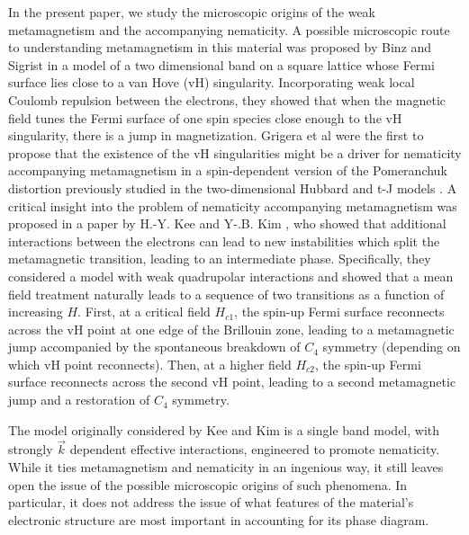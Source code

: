 \documentclass[prb,aps,amssymb,showpacs,twocolumn,amsmath,floatfix]{revtex4}
\begin{document}
In the present paper, we study the microscopic origins of the weak metamagnetism and the accompanying nematicity.  
A possible microscopic route to understanding metamagnetism in this material was proposed by Binz and
Sigrist \cite{Binz2004} in a model  of a 
two dimensional band on a square lattice whose Fermi surface lies close to a van Hove (vH)
singularity.  
Incorporating weak local Coulomb repulsion between the electrons, they showed
that when the magnetic field tunes the Fermi surface of one spin species
close enough to the vH singularity, there is a jump in magnetization. 
Grigera et al \cite{Grigera2004}  were the first to propose that the existence of the vH singularities might be a driver for nematicity accompanying metamagnetism in a spin-dependent version of the Pomeranchuk distortion\cite{Wu2007} previously studied in the two-dimensional Hubbard and t-J models 
\cite{Yamase2000, Halboth2000}.  
A critical insight into the problem of nematicity accompanying metamagnetism was proposed in a paper by H.-Y. Kee and Y-.B. Kim \cite{Kee2005}, who 
 showed that additional interactions between the electrons can
lead to new instabilities which split the metamagnetic transition, leading
to an intermediate phase. Specifically, they considered a model with weak quadrupolar
interactions and showed that a mean field treatment
naturally leads to a sequence of two transitions as a function of increasing $H$. First, at a critical field $H_{c1}$, the spin-up Fermi surface reconnects  across the vH point at one edge of the Brillouin zone, leading to a metamagnetic jump  accompanied by the
spontaneous breakdown of $C_4$ symmetry (depending on which vH point reconnects).  
Then, at a   higher field $H_{c2}$, the spin-up Fermi surface reconnects across the second vH point, leading to a second metamagnetic jump and a restoration of   $C_4$ symmetry. 


The model originally considered by Kee and Kim\cite{Kee2005}  is a single  band model, with strongly $\vec k$ dependent effective interactions, engineered to promote nematicity.  
While it ties metamagnetism and nematicity in an ingenious way, it still 
leaves open the issue of the possible microscopic origins of such phenomena.  In particular, 
it does not address the issue of what features of the material's electronic structure are most 
important in accounting for its phase diagram.  
\end{document}

